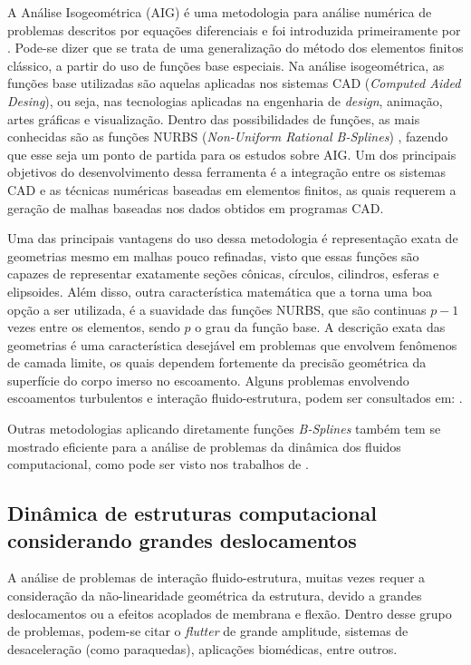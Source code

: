 A Análise Isogeométrica (AIG) é uma metodologia para análise numérica de problemas descritos por equações diferenciais e foi introduzida primeiramente por . Pode-se dizer que se trata de uma generalização do método dos elementos finitos clássico, a partir do uso de funções base especiais. Na análise isogeométrica, as funções base utilizadas são aquelas aplicadas nos sistemas CAD (\textit{Computed Aided Desing}), ou seja, nas tecnologias aplicadas na engenharia de \textit{design}, animação, artes gráficas e visualização.  Dentro das possibilidades de funções, as mais conhecidas são as funções NURBS (\textit{Non-Uniform Rational B-Splines}) \cite{PiegT:1996}, fazendo que esse seja um ponto de partida para os estudos sobre AIG. Um dos principais objetivos do desenvolvimento dessa ferramenta é a integração entre os sistemas CAD e as técnicas numéricas baseadas em elementos finitos, as quais requerem a geração de malhas baseadas nos dados obtidos em programas CAD. 
		
Uma das principais vantagens do uso dessa metodologia é representação exata de geometrias mesmo em malhas pouco refinadas, visto que essas funções são capazes de representar exatamente seções cônicas, círculos, cilindros, esferas e elipsoides. Além disso, outra característica matemática que a torna uma boa opção a ser utilizada, é a suavidade das funções NURBS, que são continuas $p-1$ vezes entre os elementos, sendo $p$ o grau da função base. A descrição exata das geometrias é uma característica desejável em problemas que envolvem fenômenos de camada limite, os quais dependem fortemente da precisão geométrica da superfície do corpo imerso no escoamento. Alguns problemas envolvendo escoamentos turbulentos e interação fluido-estrutura, podem ser consultados em: .
	
Outras metodologias aplicando diretamente funções \textit{B-Splines} também tem se mostrado eficiente para a análise de problemas da dinâmica dos fluidos computacional, como pode ser visto nos trabalhos de .


\subsection{Dinâmica de estruturas computacional considerando grandes deslocamentos}
\label{csdsection}

A análise de problemas de interação fluido-estrutura, muitas vezes requer a consideração da não-linearidade geométrica da estrutura, devido a grandes deslocamentos ou a efeitos acoplados de membrana e flexão. Dentro desse grupo de problemas, podem-se citar o \textit{flutter} de grande amplitude, sistemas de desaceleração (como paraquedas), aplicações biomédicas, entre outros.

